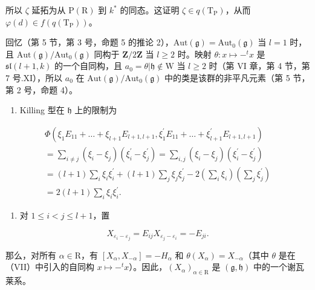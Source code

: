所以 \(\zeta\) 延拓为从 \(\mathrm{P}(\mathrm{R})\) 到 \(k^{*}\) 的同态。这证明 \(\zeta \in q(\mathrm{T}_{\mathrm{P}})\)，从而 \(\varphi(d) \in f(q(\mathrm{T}_{\mathrm{P}}))\)。

回忆（第 5 节，第 3 号，命题 5 的推论 2），\(\mathrm{Aut}(\mathfrak{g}) = \mathrm{Aut}_0(\mathfrak{g})\) 当 \(l = 1\) 时，且 \(\mathrm{Aut}(\mathfrak{g}) / \mathrm{Aut}_0(\mathfrak{g})\) 同构于 \(\mathbf{Z}/2\mathbf{Z}\) 当 \(l \geq 2\) 时。映射 \(\theta : x \mapsto -^t x\) 是 \(\mathfrak{sl}(l + 1, k)\) 的一个自同构，且 \(a_0 = \theta|\mathfrak{h} \notin \mathrm{W}\) 当 \(l \geq 2\) 时（第 VI 章，第 4 节，第 7 号.XI），所以 \(a_0\) 在 \(\mathrm{Aut}(\mathfrak{g}) / \mathrm{Aut}_0(\mathfrak{g})\) 中的类是该群的非平凡元素（第 5 节，第 2 号，命题 4）。

\begin{enumerate}
\def\labelenumi{(\Roman{enumi})}
\setcounter{enumi}{7}
\tightlist
\item
  Killing 型在 \(\mathfrak{h}\) 上的限制为
\end{enumerate}

\[
\begin{array}{l} \Phi (\xi_ {1} E _ {1 1} + \dots + \xi_ {l + 1} E _ {l + 1, l + 1}, \xi_ {1} ^ {\prime} E _ {1 1} + \dots + \xi_ {l + 1} ^ {\prime} E _ {l + 1, l + 1}) \\ = \sum_ {i \neq j} (\xi_ {i} - \xi_ {j}) (\xi_ {i} ^ {\prime} - \xi_ {j} ^ {\prime}) = \sum_ {i, j} (\xi_ {i} - \xi_ {j}) (\xi_ {i} ^ {\prime} - \xi_ {j} ^ {\prime}) \\ = (l + 1) \sum_ {i} \xi_ {i} \xi_ {i} ^ {\prime} + (l + 1) \sum_ {j} \xi_ {j} \xi_ {j} ^ {\prime} - 2 \left(\sum_ {i} \xi_ {i}\right) \left(\sum_ {j} \xi_ {j} ^ {\prime}\right) \\ = 2 (l + 1) \sum_ {i} \xi_ {i} \xi_ {i} ^ {\prime}. \end{array}
\]

\begin{enumerate}
\def\labelenumi{(\Roman{enumi})}
\setcounter{enumi}{8}
\tightlist
\item
  对 \(1 \leq i < j \leq l + 1\)，置
\end{enumerate}

\[
X _ {\varepsilon_ {i} - \varepsilon_ {j}} = E _ {i j} X _ {\varepsilon_ {j} - \varepsilon_ {i}} = - E _ {j i}.
\]

那么，对所有 \(\alpha \in \mathrm{R}\)，有 \([X_{\alpha}, X_{-\alpha}] = -H_{\alpha}\) 和 \(\theta(X_{\alpha}) = X_{-\alpha}\)（其中 \(\theta\) 是在（VII）中引入的自同构 \(x \mapsto -^{t} x\)）。因此，\((X_{\alpha})_{\alpha \in \mathrm{R}}\) 是 \((\mathfrak{g}, \mathfrak{h})\) 中的一个谢瓦莱系。

